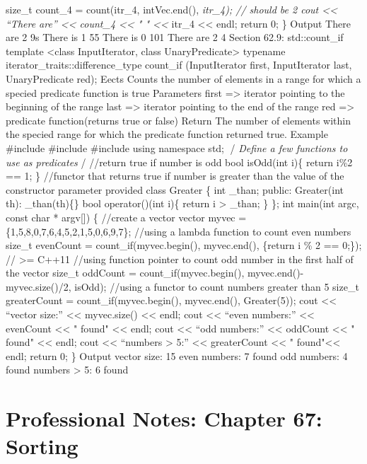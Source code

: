 size\_t count\_4 = count(itr\_4, intVec.end(), \emph{itr\_4); // should
be 2 cout \textless\textless{} ``There are'' \textless\textless{}
count\_4 \textless\textless{} " " \textless\textless{} }itr\_4
\textless\textless{} endl; return 0; \} Output There are 2 9s There is 1
55 There is 0 101 There are 2 4 Section 62.9: std::count\_if template
\textless class InputIterator, class UnaryPredicate\textgreater{}
typename iterator\_traits::difference\_type count\_if (InputIterator
first, InputIterator last, UnaryPredicate red); Eects Counts the number
of elements in a range for which a specied predicate function is true
Parameters first =\textgreater{} iterator pointing to the beginning of
the range last =\textgreater{} iterator pointing to the end of the range
red =\textgreater{} predicate function(returns true or false) Return The
number of elements within the specied range for which the predicate
function returned true. Example \#include \#include \#include using
namespace std; /\emph{ Define a few functions to use as predicates }/
//return true if number is odd bool isOdd(int i)\{ return i\%2 == 1; \}
//functor that returns true if number is greater than the value of the
constructor parameter provided class Greater \{ int \_than; public:
Greater(int th): \_than(th)\{\} bool operator()(int i)\{ return i
\textgreater{} \_than; \} \}; int main(int argc, const char *
argv{[}{]}) \{ //create a vector vector myvec =
\{1,5,8,0,7,6,4,5,2,1,5,0,6,9,7\}; //using a lambda function to count
even numbers size\_t evenCount = count\_if(myvec.begin(), myvec.end(),
\href{int\%20i}{}\{return i \% 2 == 0;\}); // \textgreater= C++11
//using function pointer to count odd number in the first half of the
vector size\_t oddCount = count\_if(myvec.begin(), myvec.end()-
myvec.size()/2, isOdd); //using a functor to count numbers greater than
5 size\_t greaterCount = count\_if(myvec.begin(), myvec.end(),
Greater(5)); cout \textless\textless{} ``vector size:''
\textless\textless{} myvec.size() \textless\textless{} endl; cout
\textless\textless{} ``even numbers:'' \textless\textless{} evenCount
\textless\textless{} " found" \textless\textless{} endl; cout
\textless\textless{} ``odd numbers:'' \textless\textless{} oddCount
\textless\textless{} " found" \textless\textless{} endl; cout
\textless\textless{} ``numbers \textgreater{} 5:'' \textless\textless{}
greaterCount \textless\textless{} " found"\textless\textless{} endl;
return 0; \} Output vector size: 15 even numbers: 7 found odd numbers: 4
found numbers \textgreater{} 5: 6 found

\hypertarget{professional-notes-chapter-67-sorting-1}{%
\chapter{Professional Notes: Chapter 67:
Sorting}\label{professional-notes-chapter-67-sorting-1}}

